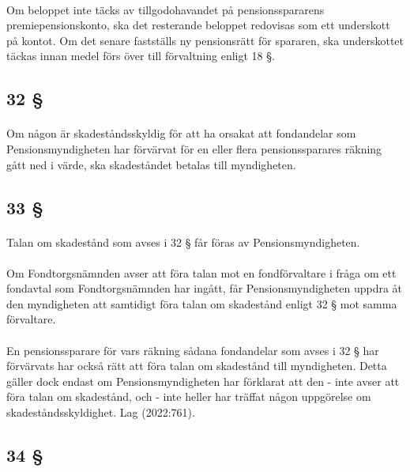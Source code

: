 \documentclass[a4paper,notitlepage,openany,10pt]{book}
\begin{document}
\paragraph*{}
Om beloppet inte täcks av tillgodohavandet på pensionsspararens premiepensionskonto, ska det resterande beloppet redovisas som ett underskott på kontot. Om det senare fastställs ny pensionsrätt för spararen, ska underskottet täckas innan medel förs över till förvaltning enligt 18 §.
\subsection*{32 §}
\paragraph*{}
Om någon är skadeståndsskyldig för att ha orsakat att fondandelar som Pensionsmyndigheten har förvärvat för en eller flera pensionssparares räkning gått ned i värde, ska skadeståndet betalas till myndigheten.
\subsection*{33 §}
\paragraph*{}
Talan om skadestånd som avses i 32 § får föras av Pensionsmyndigheten.
\paragraph*{}
Om Fondtorgsnämnden avser att föra talan mot en fondförvaltare i fråga om ett fondavtal som Fondtorgsnämnden har ingått, får Pensionsmyndigheten uppdra åt den myndigheten att samtidigt föra talan om skadestånd enligt 32 § mot samma förvaltare.
\paragraph*{}
En pensionssparare för vars räkning sådana fondandelar som avses i 32 § har förvärvats har också rätt att föra talan om skadestånd till myndigheten. Detta gäller dock endast om Pensionsmyndigheten har förklarat att den
\newline - inte avser att föra talan om skadestånd, och
\newline - inte heller har träffat någon uppgörelse om skadeståndsskyldighet.
Lag (2022:761).
\subsection*{34 §}
\end{document}
